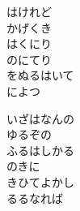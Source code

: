 \documentclass[10pt,b5j]{tarticle} %
\begin{document}
\begin{enumerate}
\begin{minipage}[c]{\blocksize}
        \vspace{\linespace}
        \item
        はけれど\\
        かげくき\\
        はくにり\\
        のにてり\\
        をぬるはいて\\
        によつ
        
        \vspace{\linespace}
        \item
        いざはなんの\\
        ゆるぞの\\
        ふるはしかる\\
        のきに\\
        きひてよかし\\
        るるなれば
    
    \end{minipage}
\end{enumerate} %
\end{document}
